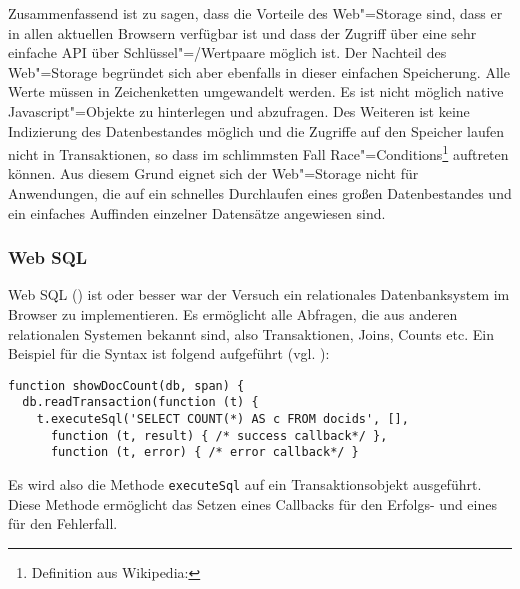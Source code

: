 Zusammenfassend ist zu sagen, dass die Vorteile des Web"=Storage sind, dass er in allen aktuellen Browsern verfügbar ist und dass der Zugriff über eine sehr einfache \ac{API} über Schlüssel"=/Wertpaare möglich ist. Der Nachteil des Web"=Storage begründet sich aber ebenfalls in dieser einfachen Speicherung. Alle Werte müssen in Zeichenketten umgewandelt werden. Es ist nicht möglich native Javascript"=Objekte zu hinterlegen und abzufragen. Des Weiteren ist keine Indizierung des Datenbestandes möglich und die Zugriffe auf den Speicher laufen nicht in Transaktionen, so dass im schlimmsten Fall Race"=Conditions\footnote{Definition aus Wikipedia: } auftreten können. Aus diesem Grund eignet sich der Web"=Storage nicht für Anwendungen, die auf ein schnelles Durchlaufen eines großen Datenbestandes und ein einfaches Auffinden einzelner Datensätze angewiesen sind.

\subsubsection*{Web \acs{SQL}}
Web \acs{SQL} () ist oder besser war der Versuch ein relationales Datenbanksystem im Browser zu implementieren. Es ermöglicht alle Abfragen, die aus anderen relationalen Systemen bekannt sind, also Transaktionen, Joins, Counts etc. Ein Beispiel für die Syntax ist folgend aufgeführt (vgl. \cite{W3C2010}):
\begin{lstlisting}
function showDocCount(db, span) {
  db.readTransaction(function (t) {
    t.executeSql('SELECT COUNT(*) AS c FROM docids', [], 
      function (t, result) { /* success callback*/ }, 
      function (t, error) { /* error callback*/ }
\end{lstlisting}
Es wird also die Methode \texttt{executeSql} auf ein Transaktionsobjekt ausgeführt. Diese Methode ermöglicht das Setzen eines Callbacks für den Erfolgs- und eines für den Fehlerfall. 

